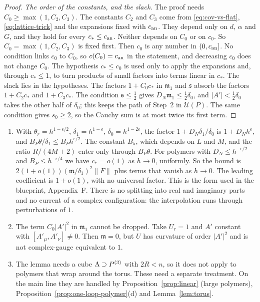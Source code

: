 \begin{proof}
\emph{The order of the constants, and the slack.} The proof needs $C_0\ge\max(1,C_2,C_3)$. The constants $C_2$ and $C_3$ come from \eqref{eq:cov-vs-flat}, \eqref{eq:lattice-trick} and the expansions fixed with $c_{\rm an}$. They depend only on $d$, $\alpha$ and $G$, and they hold for every $c_*\le c_{\rm an}$. Neither depends on $C_0$ or on $c_0$. So $C_0=\max(1,C_2,C_3)$ is fixed first. Then $c_0$ is any number in $(0,c_{\rm an}]$. No condition links $c_0$ to $C_0$, so $c(C_0)=c_{\rm an}$ in the statement, and decreasing $c_0$ does not change $C_0$. The hypothesis $c_*\le c_0$ is used only to apply the expansions and, through $c_*\le1$, to turn products of small factors into terms linear in $c_*$. The slack lies in the hypotheses. The factors $1+C_0c_*$ in $\mathfrak m_1$ and $\mathfrak s$ absorb the factors $1+C_2c_*$ and $1+C_3c_*$. The condition $\mathfrak s\le\frac12$ gives $D_N\mathfrak m_1\le\frac12\delta_0$, and $|A'|<\frac12\delta_0$ takes the other half of $\delta_0$; this keeps the path of Step~2 in $\mathcal U(P)$. The same condition gives $s_0\ge2$, so the Cauchy sum is at most twice its first term.
\end{proof}

\begin{remark}\label{rem:quadratic-D3}
\begin{enumerate}[label=(\alph*)]
\item With $\theta_r=h^{1-\epsilon/2}$, $\delta_1=h^{1-\epsilon}$, $\delta_0=h^{1-2\epsilon}$, the factor $1+D_N\delta_1/\delta_0$ is $1+D_Nh^\epsilon$, and $B_P\theta/\delta_1\le B_Ph^{\epsilon/2}$. The constant $B_5$, which depends on $L$ and $M$, and the ratio $R/(4M+2)$ enter only through $B_P\theta$. For polymers with $D_N\le h^{-\epsilon/2}$ and $B_P\le h^{-\epsilon/4}$ we have $c_*=o(1)$ as $h\to0$, uniformly. So the bound is $2(1+o(1))(\mathfrak m/\delta_1)^2\|F\|$ plus terms that vanish as $h\to0$. The leading coefficient is $1+o(1)$, with no universal factor. This is the form used in the blueprint, Appendix~F. There is no splitting into real and imaginary parts and no current of a complex configuration: the interpolation runs through perturbations of $1$.
\item The term $C_0|A'|^2$ in $\mathfrak m_1$ cannot be dropped. Take $U_r=1$ and $A'$ constant with $[A'_\mu,A'_\nu]\ne0$. Then $\mathfrak m=0$, but $U$ has curvature of order $|A'|^2$ and is not complex-gauge equivalent to $1$.
\item The lemma needs a cube $\Lambda\supset P^{(3)}$ with $2R<n$, so it does not apply to polymers that wrap around the torus. These need a separate treatment. On the main line they are handled by Proposition~\ref{prop:linear} (large polymers), Proposition~\ref{prop:one-loop-polymer}(d) and Lemma~\ref{lem:torus}.
\end{enumerate}
\end{remark}

